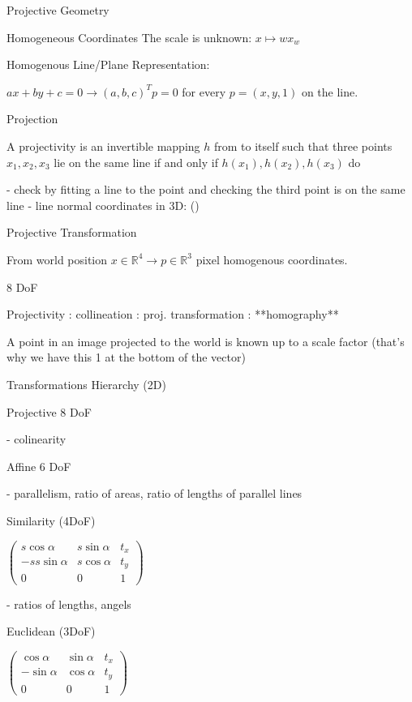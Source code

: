 \begin{section}
\begin{subsubsection}
\begin{subsubsection}
\begin{subsubsection}
\begin{section}{Projective Geometry}
\begin{subsection}{Homogeneous Coordinates}
The scale is unknown: $x \mapsto  w x_w$

\begin{subsubsection}{ Homogenous Line/Plane Representation:

$ax+by+c = 0 \to (a,b,c)^T p = 0$ for every $p = (x,y,1)$ on the line.

\begin{subsubsection}{Projection}

A projectivity is an invertible mapping $h$ from  to itself such that three points $x_1 , x_2 , x_3$ lie on the same line if and only if $h(x_1), h(x_2 ), h(x_3)$ do

- check by fitting a line to the point and checking the third point is on the same line
- line normal coordinates in 3D: ()

\begin{subsubsection}{Projective Transformation}

From  world position $x \in \mathbb R^4 \to p \in \mathbb R^3$ pixel homogenous coordinates. 

8 DoF

Projectivity : collineation :  proj. transformation : **homography**

A point in an image projected to the world is known up to a scale factor (that's why we have this 1 at the bottom of the vector)

\begin{subsection} Transformations Hierarchy (2D)

Projective 8 DoF

- colinearity

Affine 6 DoF

- parallelism, ratio of areas, ratio of lengths of parallel lines

Similarity (4DoF)

$\left(  \begin{matrix} s\cos  \alpha &  s\sin \alpha  & t_x \\  -s s\sin \alpha & s\cos \alpha & t_y \\ 0 & 0 & 1  \end{matrix} \right)$

- ratios of lengths, angels

Euclidean (3DoF)

$\left(  \begin{matrix} \cos  \alpha & \sin \alpha  & t_x \\  -\sin \alpha & \cos \alpha & t_y \\ 0 & 0 & 1  \end{matrix} \right)$


\end{subsection}
\end{subsubsection}
\end{subsubsection}}
\end{subsubsection}
\end{subsection}
\end{section}
\end{subsubsection}
\end{subsubsection}
\end{subsubsection}
\end{section}
